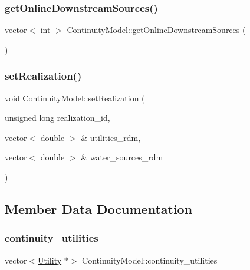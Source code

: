 \subsubsection{\texorpdfstring{get\+Online\+Downstream\+Sources()}{getOnlineDownstreamSources()}}
{\footnotesize\ttfamily vector$<$ int $>$ Continuity\+Model\+::get\+Online\+Downstream\+Sources (\begin{DoxyParamCaption}{ }\end{DoxyParamCaption})}

\mbox{\label{classContinuityModel_a47504c599955b8193ffab3bd0f328144}} 
\subsubsection{\texorpdfstring{set\+Realization()}{setRealization()}}
{\footnotesize\ttfamily void Continuity\+Model\+::set\+Realization (\begin{DoxyParamCaption}\item[{unsigned long}]{realization\+\_\+id,  }\item[{vector$<$ double $>$ \&}]{utilities\+\_\+rdm,  }\item[{vector$<$ double $>$ \&}]{water\+\_\+sources\+\_\+rdm }\end{DoxyParamCaption})}



\subsection{Member Data Documentation}
\mbox{\label{classContinuityModel_adc77a0214d553a961035ce86c93cf9be}} 
\subsubsection{\texorpdfstring{continuity\+\_\+utilities}{continuity\_utilities}}
{\footnotesize\ttfamily vector$<$\mbox{\hyperlink{classUtility}{Utility}} $\ast$$>$ Continuity\+Model\+::continuity\+\_\+utilities\hspace{0.3cm}{\ttfamily [protected]}}

